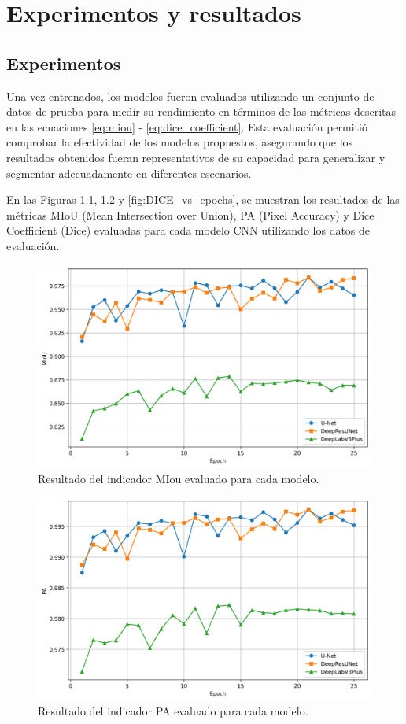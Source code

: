 \chapter{Experimentos y resultados}
\doublespacing
\section{Experimentos}

Una vez entrenados, los modelos fueron evaluados utilizando un conjunto de datos de prueba para medir su rendimiento en términos de las métricas descritas en las ecuaciones \ref{eq:miou} - \ref{eq:dice_coefficient}. Esta evaluación permitió comprobar la efectividad de los modelos propuestos, asegurando que los resultados obtenidos fueran representativos de su capacidad para generalizar y segmentar adecuadamente en diferentes escenarios.

En las Figuras \ref{fig:Miou_vs_epochs}, \ref{fig:PA_vs_epochs} y \ref{fig:DICE_vs_epochs}, se muestran los resultados de las métricas MIoU (Mean Intersection over Union), PA (Pixel Accuracy) y Dice Coefficient (Dice) evaluadas para cada modelo CNN utilizando los datos de evaluación. 

\begin{figure}[h!]
	\centering
	\includegraphics[width=0.7\linewidth]{graficos/Miou_vs_epochs}
	\caption[Resultado del indicador MIou evaluado para cada modelo.]{Resultado del indicador MIou evaluado para cada modelo.
	}
	\label{fig:Miou_vs_epochs}
\end{figure}

\begin{figure}[h!]
	\centering
	\includegraphics[width=0.7\linewidth]{graficos/PA_vs_epochs}
	\caption[Resultado del indicador PA evaluado para cada modelo.]{Resultado del indicador PA evaluado para cada modelo.
	}
	\label{fig:PA_vs_epochs}
\end{figure}

